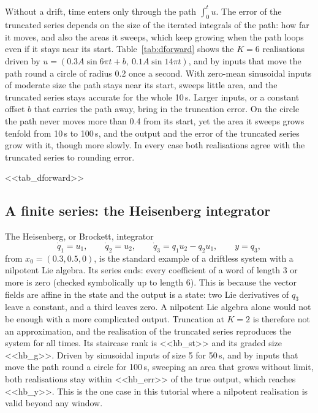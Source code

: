 \documentclass[11pt,a4paper]{article}
\theoremstyle{remark}
\begin{document}
Without a drift, time enters only through the path $\int_0^tu$.
The error of the truncated series depends on the size of the iterated integrals of the path: how far it moves, and also the areas it sweeps, which keep growing when the path loops even if it stays near its start.
Table~\ref{tab:dforward} shows the $K=6$ realisations driven by $u=(0.3A\sin 6\pi t+b,\ 0.1A\sin 14\pi t)$, and by inputs that move the path round a circle of radius 0.2 once a second.
With zero-mean sinusoidal inputs of moderate size the path stays near its start, sweeps little area, and the truncated series stays accurate for the whole 10\,s.
Larger inputs, or a constant offset $b$ that carries the path away, bring in the truncation error.
On the circle the path never moves more than 0.4 from its start, yet the area it sweeps grows tenfold from 10\,s to 100\,s, and the output and the error of the truncated series grow with it, though more slowly.
In every case both realisations agree with the truncated series to rounding error.

\begin{table}[t]\centering\small
\caption{The driftless Duffing series truncated at $K=6$ and its realisations. Excursion: largest value of $|\int_0^tu_i|$ over both channels. Area: largest absolute signed area swept by the path, $\tfrac12|I_{(1,2)}-I_{(2,1)}|$. Errors are largest absolute differences.}\label{tab:dforward}
<<tab_dforward>>
\end{table}

\subsection{A finite series: the Heisenberg integrator}\label{sec:heisenberg}
The Heisenberg, or Brockett, integrator
\[\dot q_1=u_1,\qquad \dot q_2=u_2,\qquad \dot q_3=q_1u_2-q_2u_1,\qquad y=q_3,\]
from $x_0=(0.3,0.5,0)$, is the standard example of a driftless system with a nilpotent Lie algebra.
Its series ends: every coefficient of a word of length 3 or more is zero (checked symbolically up to length 6).
This is because the vector fields are affine in the state and the output is a state: two Lie derivatives of $q_3$ leave a constant, and a third leaves zero. A nilpotent Lie algebra alone would not be enough with a more complicated output.
Truncation at $K=2$ is therefore not an approximation, and the realisation of the truncated series reproduces the system for all times.
Its staircase rank is <<hb_st>> and its graded size <<hb_g>>.
Driven by sinusoidal inputs of size 5 for 50\,s, and by inputs that move the path round a circle for 100\,s, sweeping an area that grows without limit, both realisations stay within <<hb_err>> of the true output, which reaches <<hb_y>>.
This is the one case in this tutorial where a nilpotent realisation is valid beyond any window.
\end{document}
